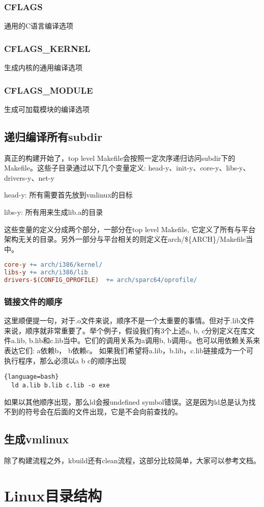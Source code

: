 \subsubsection{CFLAGS}
通用的C语言编译选项
\subsubsection{CFLAGS\_KERNEL}
生成内核的通用编译选项
\subsubsection{CFLAGS\_MODULE}
生成可加载模块的编译选项
\subsection{递归编译所有subdir}
真正的构建开始了，top level Makefile会按照一定次序递归访问subdir下的Makefile。这些子目录通过以下几个变量定义:
head-y、init-y、core-y、libs-y、drivers-y、net-y
\begin{compactenum}
\item head-y: 所有需要首先放到vmlinux的目标
\item libs-y: 所有用来生成lib.a的目录
\end{compactenum}
这些变量的定义分成两个部分，一部分在top level Makefile, 它定义了所有与平台架构无关的目录。另外一部分与平台相关的则定义在arch/\$\{ARCH\}/Makefile当中。
\begin{lstlisting}[language=make]
core-y += arch/i386/kernel/
libs-y += arch/i386/lib
drivers-$(CONFIG_OPROFILE)  += arch/sparc64/oprofile/
\end{lstlisting}

\subsubsection{链接文件的顺序}
这里顺便提一句，对于.o文件来说，顺序不是一个太重要的事情。但对于.lib文件来说，顺序就非常重要了。举个例子，假设我们有3个上述a, b, c分别定义在库文件a.lib, b.lib和c.lib当中。它们的调用关系为a调用b, b调用c。也可以用依赖关系来表达它们: a依赖b， b依赖c。
如果我们希望将a.lib，b.lib，c.lib链接成为一个可执行程序，那么必须以a b c的顺序出现
\begin{lstlisting}{language=bash}
  ld a.lib b.lib c.lib -o exe
\end{lstlisting}
如果以其他顺序出现，那么ld会报undefined symbol错误。这是因为ld总是认为找不到的符号会在后面的文件出现，它是不会向前查找的。
\subsection{生成vmlinux}

除了构建流程之外，kbuild还有clean流程，这部分比较简单，大家可以参考文档。


\section{Linux目录结构}

